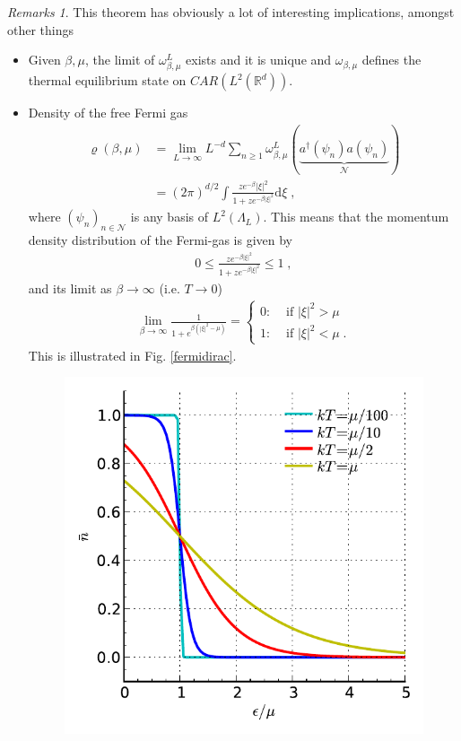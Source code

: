 \documentclass[
a4paper, %
11pt, %
onecolumn, %
openany, %
]{memoir}
\theoremstyle{definition}
\theoremstyle{remark}
\newtheorem{remarks}{Remarks}[chapter]
\theoremstyle{plain}
\begin{document}
\begin{remarks} This theorem has obviously a lot of interesting implications, amongst other things
	\begin{itemize}
		 \item Given $\beta,\mu$, the limit of $\omega_{\beta,\mu}^L$ exists and it is unique and $\omega_{\beta,\mu}$ defines the thermal equilibrium state on $CAR(L^2(\mathbb{R}^d))$.
		 \item Density of the free Fermi gas \begin{align}
		 \varrho(\beta,\mu)&=\lim_{L\rightarrow\infty}L^{-d}\sum_{n\geq 1} \omega_{\beta,\mu}^L(\underbrace{a^{\dagger}(\psi_n)a(\psi_n)}_{\mathcal{N}})\\
		 &=(2\pi)^{d/2}\int \frac{ze^{-\beta}|\xi|^2}{1+ze^{-\beta|\xi|^2}}\mathrm{d}\xi\; ,
		 \end{align}
		 where $(\psi_n)_{n\in\mathcal{N}}$ is any basis of $L^2(\Lambda_L)$. This means that the momentum density distribution of the Fermi-gas is given by\begin{align}
		 0\leq \frac{ze^{-\beta|\xi|^2}}{1+ze^{-\beta|\xi|^2}}\leq 1\; ,
		 \end{align}
		 and its limit as $\beta\rightarrow\infty$ (i.e. $T\rightarrow 0$) \begin{align}
		 \lim_{\beta\rightarrow \infty}\frac{1}{1+e^{\beta(|\xi|^2-\mu)}}=\begin{cases}
		 0 :& \text{ if }|\xi|^2 > \mu\\
		 1 :& \text{ if }|\xi|^2< \mu \; .
		 \end{cases}\label{eqn::limit_of_fermi_density}
		 \end{align}
		 This is illustrated in Fig. \ref{fermidirac}. \begin{figure}\centering
		 	\includegraphics[scale=1]{fermidirac.pdf}

\end{figure}
\end{itemize}
\end{remarks}
\end{document}
